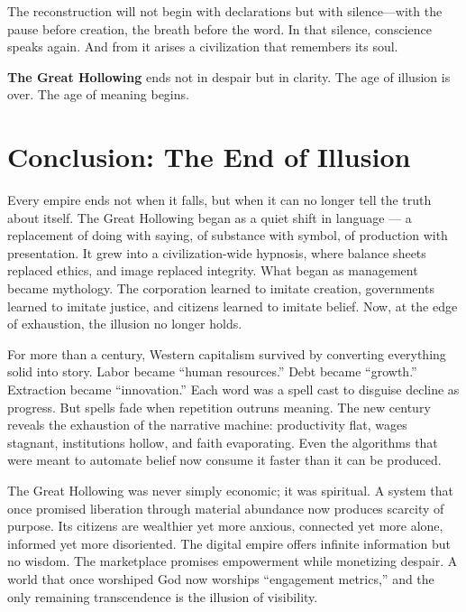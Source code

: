 \documentclass[11pt,twoside]{book}
\begin{document}
The reconstruction will not begin with declarations but with silence—with the pause before creation, the breath before the word.  
In that silence, conscience speaks again.  
And from it arises a civilization that remembers its soul.

\textbf{The Great Hollowing} ends not in despair but in clarity.  
The age of illusion is over.  
The age of meaning begins.

% 

\chapter{Conclusion: The End of Illusion}
\label{ch:42}

Every empire ends not when it falls, but when it can no longer tell the truth about itself.  
The Great Hollowing began as a quiet shift in language — a replacement of doing with saying, of substance with symbol, of production with presentation.  It grew into a civilization-wide hypnosis, where balance sheets replaced ethics, and image replaced integrity.  What began as management became mythology.  The corporation learned to imitate creation, governments learned to imitate justice, and citizens learned to imitate belief.  Now, at the edge of exhaustion, the illusion no longer holds.

For more than a century, Western capitalism survived by converting everything solid into story.  Labor became “human resources.”  Debt became “growth.”  Extraction became “innovation.”  Each word was a spell cast to disguise decline as progress.  But spells fade when repetition outruns meaning.  The new century reveals the exhaustion of the narrative machine: productivity flat, wages stagnant, institutions hollow, and faith evaporating.  Even the algorithms that were meant to automate belief now consume it faster than it can be produced.

The Great Hollowing was never simply economic; it was spiritual.  A system that once promised liberation through material abundance now produces scarcity of purpose.  Its citizens are wealthier yet more anxious, connected yet more alone, informed yet more disoriented.  The digital empire offers infinite information but no wisdom.  The marketplace promises empowerment while monetizing despair.  A world that once worshiped God now worships “engagement metrics,” and the only remaining transcendence is the illusion of visibility.
\end{document}
